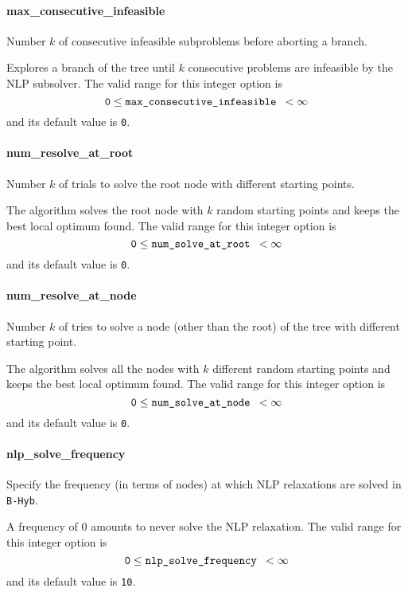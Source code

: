 
\paragraph{max\_consecutive\_infeasible}
\label{max_consecutive_infeasible}
Number $k$ of consecutive infeasible subproblems before aborting a branch.

 Explores a branch of the tree
      until $k$ consecutive
problems are infeasible by the NLP subsolver. The valid range for
this integer option is
$${\tt 0} \le \hbox{\tt max\_consecutive\_infeasible } <  \infty$$
and its default value is {\tt 0}.


\paragraph{num\_resolve\_at\_root}
\label{num_resolve_at_root}
Number $k$ of trials to solve the root node with different starting points.

 The algorithm solves the root node with $k$
random starting points and keeps the best
local optimum found. The valid range for this integer option is
$${\tt 0} \le \hbox{\tt num\_solve\_at\_root } <  \infty $$
and its default value is {\tt 0}.


\paragraph{num\_resolve\_at\_node}
\label{num_resolve_at_node}
Number $k$ of tries to solve a node (other than the root) of the tree with different starting point.

 The algorithm solves all the nodes with $k$
different random starting points and keeps
the best local optimum found. The valid range for this integer option is
$${\tt 0} \le \hbox{\tt num\_solve\_at\_node } <  \infty$$
and its default value is {\tt 0}.




\paragraph{nlp\_solve\_frequency}
\label{nlp_solve_frequency}
Specify the frequency (in terms of nodes) at which NLP relaxations
are solved in {\tt B-Hyb}.

 A frequency of 0 amounts to never solve the
NLP relaxation. The valid range for this integer option is
$${\tt 0} \le \hbox{\tt nlp\_solve\_frequency } <  \infty$$
and its default value is {\tt 10}.


